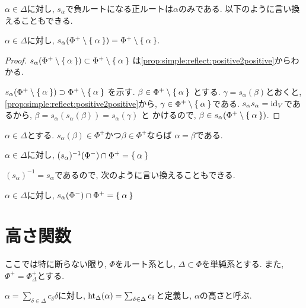 $\alpha\in\Delta$に対し,
$s_\alpha$で負ルートになる正ルートは$\alpha$のみである.
以下のように言い換えることもできる.
\begin{cor}
  $\alpha\in\Delta$に対し,
  $s_\alpha(\Phi^+\setminus\Set{\alpha})=\Phi^+\setminus\Set{\alpha}$.
\end{cor}
\begin{proof}
$s_\alpha(\Phi^+\setminus\Set{\alpha})\subset\Phi^+\setminus\Set{\alpha}$
は\cref{prop:simple:reflect:positive2positive}からわかる.

$s_\alpha(\Phi^+\setminus\Set{\alpha})\supset\Phi^+\setminus\Set{\alpha}$
を示す.
$\beta\in\Phi^+\setminus\Set{\alpha}$
とする.
$\gamma=s_\alpha(\beta)$とおくと,
\cref{prop:simple:reflect:positive2positive}から,
$\gamma\in \Phi^+\setminus\Set{\alpha}$である.
$s_\alpha s_\alpha=\operatorname{id}_V$であるから,
$\beta=s_\alpha(s_\alpha(\beta))=s_\alpha(\gamma)$
と
かけるので, $\beta\in s_\alpha(\Phi^+\setminus\Set{\alpha})$.
\end{proof}
\begin{cor}
  $\alpha\in\Delta$とする.
  $s_\alpha(\beta)\in\Phi^+$かつ$\beta\in\Phi^+$ならば
  $\alpha=\beta$である.
\end{cor}
\begin{cor}
  $\alpha\in\Delta$に対し,
  $(s_\alpha)^{-1}(\Phi^-)\cap\Phi^+=\Set{\alpha}$
\end{cor}
$(s_\alpha)^{-1}=s_\alpha$であるので,
次のように言い換えることもできる.
\begin{cor}
  $\alpha\in\Delta$に対し,
  $s_\alpha(\Phi^-)\cap\Phi^+=\Set{\alpha}$
\end{cor}

\section{高さ関数}
ここでは特に断らない限り,
$\Phi$をルート系とし, $\Delta\subset\Phi$を単純系とする.
また, $\Phi^+=\Phi_\Delta^+$とする.
\begin{definition}
  $\alpha=\sum_{\delta\in\Delta}c_\delta \delta$に対し,
  $\operatorname{ht}_\Delta(\alpha)=\sum_{\delta\in\Delta}c_\delta$と定義し,
  $\alpha$の高さと呼ぶ.
\end{definition}

